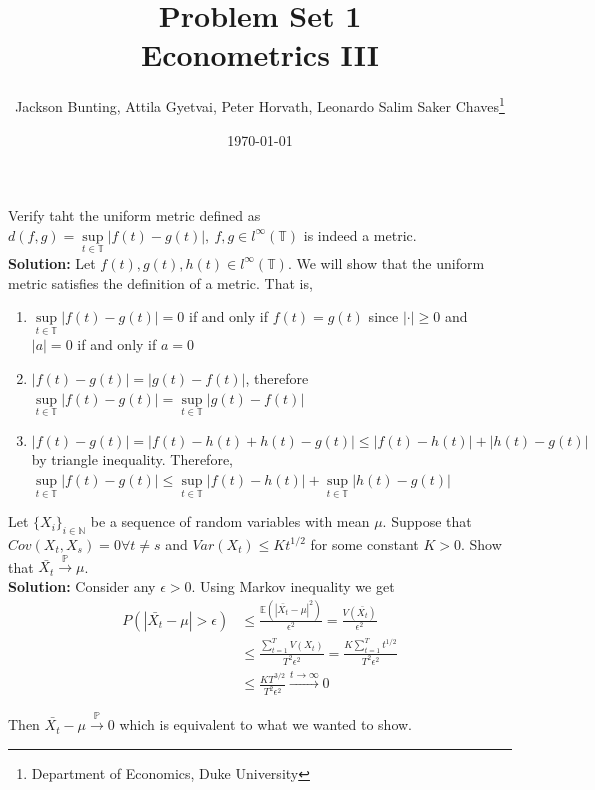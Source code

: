 \documentclass[11pt,letterpaper]{article}                  %
\title{Problem Set 1 \\ \medskip \Large{Econometrics III}}
\author{\Large Jackson Bunting, Attila Gyetvai, Peter Horvath, Leonardo Salim Saker Chaves\footnote{Department of Economics, Duke University}}
\date{\today}
\begin{document}
\maketitle
\begin{problem}
Verify taht the uniform metric defined as $d (f, g) = \sup\limits_{t \in \mathbb{T}} |f(t) - g(t)|, \:  f, g \in l^{\infty}(\mathbb{T})$ is indeed a metric. \\

\textbf{Solution:} Let $f(t), g(t), h(t) \in l^{\infty}(\mathbb{T})$. We will show that the uniform metric satisfies the definition of a metric. That is, 
\begin{enumerate}
	\item  $\sup\limits_{t \in \mathbb{T}} |f(t) - g(t)| = 0$ if and only if $f(t) = g(t)$ since $|\cdot| \geq 0$ and $|a| = 0$ if and only if $a = 0$
	\item  $|f(t) - g(t)| = |g(t) - f(t)|$, therefore $\sup\limits_{t \in \mathbb{T}} |f(t) - g(t)| = \sup\limits_{t \in \mathbb{T}} |g(t) - f(t)|$
	\item $|f(t) - g(t)| = |f(t) - h(t) + h(t) - g(t)| \leq |f(t) - h(t)| +  |h(t) - g(t)|$ by triangle inequality. Therefore, $\sup\limits_{t \in \mathbb{T}} |f(t) - g(t)| \leq  \sup\limits_{t \in \mathbb{T}} |f(t) - h(t)| + \sup\limits_{t \in \mathbb{T}} |h(t) - g(t)|$
\end{enumerate}
\end{problem}

\bigskip
\begin{problem}

\end{problem}

\bigskip
\begin{problem}
Let $\{X_i\}_{i \in \mathbb{N}}$ be a sequence of random variables with mean $\mu$. Suppose that $Cov(X_t,X_s)=0 \forall t\neq s$ and $Var(X_t) \leq Kt^{1/2}$ for some constant $K>0$. Show that $\bar{X_t} \overset{\mathbb{P}}{\rightarrow} \mu$.\\

\textbf{Solution:} Consider any $\epsilon>0$. Using Markov inequality we get
\begin{align*}
P(|\bar{X_t} - \mu| > \epsilon) &\leq \frac{\mathbb{E}( |\bar{X_t} - \mu|^2)}{\epsilon^2} = \frac{V(\bar{X_t})}{\epsilon^2} \\
&\leq \frac{\sum_{t=1}^T V(X_t)}{T^2 \epsilon^2} = \frac{K \sum_{t=1}^T t^{1/2}}{T^2 \epsilon^2} \\
&\leq \frac{K T^{3/2}}{T^2 \epsilon^2} \overset{t \to \infty}{\longrightarrow} 0
\end{align*}

Then $\bar{X_t} - \mu \overset{\mathbb{P}}{\rightarrow} 0$ which is equivalent to what we wanted to show.
\end{problem}
\end{document}
